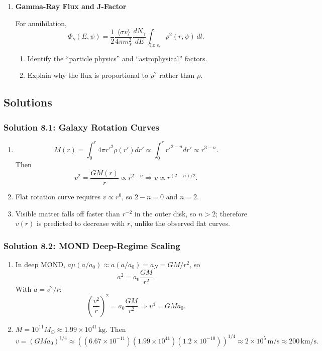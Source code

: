 \begin{enumerate}[label=8.\arabic*]
  \item \label{q:8.4} \textbf{Gamma-Ray Flux and J-Factor}
  
  For annihilation,
  \[
    \Phi_\gamma(E,\psi)=\frac{1}{2}\frac{\langle\sigma v\rangle}{4\pi m_\chi^2}
    \frac{dN_\gamma}{dE}\int_{\text{l.o.s.}}\rho^2(r,\psi)\,dl.
  \]
  \begin{enumerate}[label=(\alph*)]
    \item Identify the ``particle physics'' and ``astrophysical'' factors.
    \item Explain why the flux is proportional to $\rho^2$ rather than $\rho$.
  \end{enumerate}
\end{enumerate}

\bigskip
\bigskip
\bigskip

\subsection{Solutions}

\subsubsection*{Solution 8.1: Galaxy Rotation Curves}

\begin{enumerate}[label=(\alph*)]
  \item
  \[
    M(r)=\int_0^r 4\pi r'^2\rho(r')dr'\propto \int_0^r r'^{2-n}dr'\propto r^{3-n}.
  \]
  Then
  \[
    v^2=\frac{GM(r)}{r}\propto r^{2-n}\Rightarrow v\propto r^{(2-n)/2}.
  \]

  \item Flat rotation curve requires $v\propto r^0$, so $2-n=0$ and $n=2$.

  \item Visible matter falls off faster than $r^{-2}$ in the outer disk, so $n>2$;
  therefore $v(r)$ is predicted to decrease with $r$, unlike the observed flat curves.
\end{enumerate}

\subsubsection*{Solution 8.2: MOND Deep-Regime Scaling}

\begin{enumerate}[label=(\alph*)]
  \item In deep MOND, $a\mu(a/a_0)\approx a(a/a_0)=a_N=GM/r^2$, so
  \[
    a^2=a_0\frac{GM}{r^2}.
  \]
  With $a=v^2/r$:
  \[
    \left(\frac{v^2}{r}\right)^2=a_0\frac{GM}{r^2}\Rightarrow v^4=GMa_0.
  \]

  \item $M=10^{11}M_\odot\approx 1.99\times10^{41}\,\mathrm{kg}$. Then
  \[
    v=(GMa_0)^{1/4}\approx \left((6.67\times10^{-11})(1.99\times10^{41})(1.2\times10^{-10})\right)^{1/4}
    \approx 2\times10^5\,\mathrm{m/s}\approx 200\,\mathrm{km/s}.
  \]
\end{enumerate}

